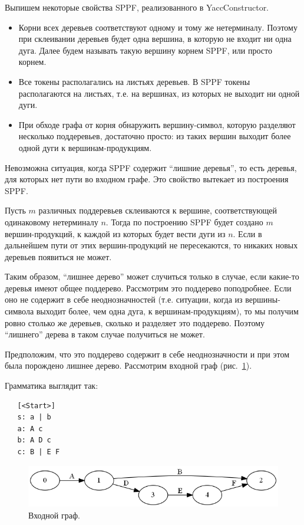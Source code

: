 Выпишем некоторые свойства SPPF, реализованного в YaccConstructor. 
\begin{itemize}
\item Корни всех деревьев соответствуют одному и тому же нетерминалу. Поэтому при склеивании деревьев будет одна вершина, в которую не входит ни одна дуга. Далее будем называть такую вершину корнем SPPF, или просто корнем. 
\item Все токены располагались на листьях деревьев. В SPPF токены располагаются на листьях, т.е. на вершинах, из которых не выходит ни одной дуги.
\item При обходе графа от корня обнаружить вершину-символ, которую разделяют несколько поддеревьев, достаточно просто: из таких вершин выходит более одной дуги к вершинам-продукциям. 
\end{itemize}

Невозможна ситуация, когда SPPF содержит ``лишние деревья'', то есть деревья, для которых нет пути во входном графе. Это свойство вытекает из построения SPPF. 

Пусть $m$ различных поддеревьев склеиваются к вершине, соответствующей одинаковому нетерминалу $n$. Тогда по построению SPPF будет создано $m$ вершин-продукций, к каждой из которых будет вести дуги из $n$. Если в дальнейшем пути от этих вершин-продукций не пересекаются, то никаких новых деревьев появиться не может. 

Таким образом, ``лишнее дерево'' может случиться только в случае, если какие-то деревья имеют общее поддерево. Рассмотрим это поддерево поподробнее. Если оно не содержит в себе неоднозначностей (т.е. ситуации, когда из вершины-символа выходит более, чем одна дуга, к вершинам-продукциям), то мы получим ровно столько же деревьев, сколько и разделяет это поддерево. Поэтому ``лишнего'' дерева в таком случае получиться не может. 

Предположим, что это поддерево содержит в себе неоднозначности и при этом была порождено лишнее дерево. Рассмотрим входной граф (рис.~\ref{sppf_proof_input}). 

Грамматика выглядит так:

\begin{verbatim}
   [<Start>]
   s: a | b
   a: A c
   b: A D c
   c: B | E F
\end{verbatim}

\begin{figure}[t]
\centering
\includegraphics[width=\linewidth]{Ivanov/Pictures/proof_input.png}
\caption{Входной граф.}
\label{sppf_proof_input}
\end{figure}

